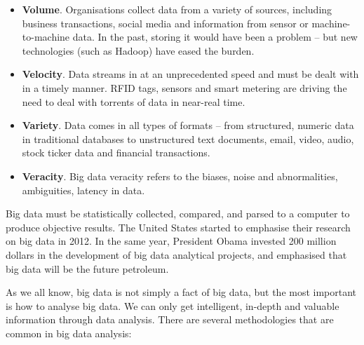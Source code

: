 \begin{itemize}
    \item \textbf{Volume}. Organisations collect data from a variety of sources, including business transactions, social media and information from sensor or machine-to-machine data. In the past, storing it would have been a problem – but new technologies (such as Hadoop) have eased the burden.
    
    \item \textbf{Velocity}. Data streams in at an unprecedented speed and must be dealt with in a timely manner. RFID tags, sensors and smart metering are driving the need to deal with torrents of data in near-real time.
    
    \item \textbf{Variety}. Data comes in all types of formats – from structured, numeric data in traditional databases to unstructured text documents, email, video, audio, stock ticker data and financial transactions.
    
    \item \textbf{Veracity}. Big data veracity refers to the biases, noise and abnormalities, ambiguities, latency in data.
    
\end{itemize}

Big data must be statistically collected, compared, and parsed to a computer to produce objective results. The United States started to emphasise their research on big data in 2012. In the same year, President Obama invested 200 million dollars in the development of big data analytical projects, and emphasised that big data will be the future petroleum. 

As we all know, big data is not simply a fact of big data, but the most important is how to analyse big data. We can only get intelligent, in-depth and valuable information through data analysis. There are several methodologies that are common in big data analysis:

